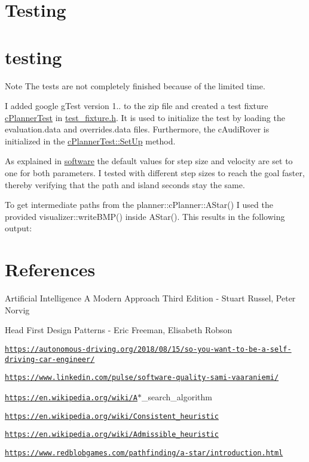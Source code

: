 \section*{Testing}\hypertarget{index_testing}{}\section{testing}\label{index_testing}
Note The tests are not completely finished because of the limited time.

I added google g\+Test version 1.. to the zip file and created a test fixture \mbox{\hyperlink{classc_planner_test}{c\+Planner\+Test}} in \mbox{\hyperlink{test__fixture_8h_source}{test\+\_\+fixture.\+h}}. It is used to initialize the test by loading the evaluation.\+data and overrides.\+data files. Furthermore, the c\+Audi\+Rover is initialized in the \mbox{\hyperlink{classc_planner_test_a88ad8b0e63c66a9d94c7606aa67ef20d}{c\+Planner\+Test\+::\+Set\+Up}} method.

As explained in \mbox{\hyperlink{index_software}{software}} the default values for step size and velocity are set to one for both parameters. I tested with different step sizes to reach the goal faster, thereby verifying that the path and island seconds stay the same.

To get intermediate paths from the planner\+::c\+Planner\+::\+A\+Star() I used the provided visualizer\+::write\+B\+M\+P() inside A\+Star(). This results in the following output\+:

\section*{References}

\begin{DoxyItemize}
\item Artificial Intelligence A Modern Approach Third Edition -\/ Stuart Russel, Peter Norvig \item Head First Design Patterns -\/ Eric Freeman, Elisabeth Robson \item \href{https://autonomous-driving.org/2018/08/15/so-you-want-to-be-a-self-driving-car-engineer/}{\tt https\+://autonomous-\/driving.\+org/2018/08/15/so-\/you-\/want-\/to-\/be-\/a-\/self-\/driving-\/car-\/engineer/} \item \href{https://www.linkedin.com/pulse/software-quality-sami-vaaraniemi/}{\tt https\+://www.\+linkedin.\+com/pulse/software-\/quality-\/sami-\/vaaraniemi/} \item \href{https://en.wikipedia.org/wiki/A}{\tt https\+://en.\+wikipedia.\+org/wiki/A}$\ast$\+\_\+search\+\_\+algorithm \item \href{https://en.wikipedia.org/wiki/Consistent_heuristic}{\tt https\+://en.\+wikipedia.\+org/wiki/\+Consistent\+\_\+heuristic} \item \href{https://en.wikipedia.org/wiki/Admissible_heuristic}{\tt https\+://en.\+wikipedia.\+org/wiki/\+Admissible\+\_\+heuristic} \item \href{https://www.redblobgames.com/pathfinding/a-star/introduction.html}{\tt https\+://www.\+redblobgames.\+com/pathfinding/a-\/star/introduction.\+html} \end{DoxyItemize}
